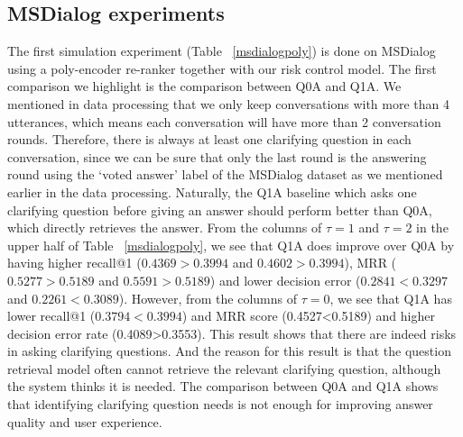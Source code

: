 \documentclass[format=acmsmall, review=False, screen=true]{acmart}
\begin{document}
\subsection{MSDialog experiments}
The first simulation experiment (Table ~\ref{msdialogpoly}) is done on MSDialog using a poly-encoder re-ranker together with our risk control model. The first comparison we highlight is the comparison between Q0A and Q1A. We mentioned in data processing that we only keep conversations with more than 4 utterances, which means each conversation will have more than 2 conversation rounds. Therefore, there is always at least one clarifying question in each conversation, since we can be sure that only the last round is the answering round using the `voted answer' label of the MSDialog dataset as we mentioned earlier in the data processing. Naturally, the Q1A baseline which asks one clarifying question before giving an answer should perform better than Q0A, which directly retrieves the answer.
From the columns of $\tau=1$ and $\tau=2$ in the upper half of Table ~\ref{msdialogpoly}, we see that Q1A does improve over Q0A by having higher recall@1 ($0.4369>0.3994$ and $0.4602>0.3994$), MRR ($0.5277>0.5189$ and $0.5591>0.5189$) and lower decision error ($0.2841<0.3297$ and $0.2261<0.3089$). However, from the columns of $\tau=0$, we see that Q1A has lower recall@1 ($0.3794<0.3994$) and MRR score (0.4527<0.5189) and higher decision error rate (0.4089>0.3553). This result shows that there are indeed risks in asking clarifying questions. And the reason for this result is that the question retrieval model often cannot retrieve the relevant clarifying question, although the system thinks it is needed. The comparison between Q0A and Q1A shows that identifying clarifying question needs is not enough for improving answer quality and user experience. 
\end{document}
